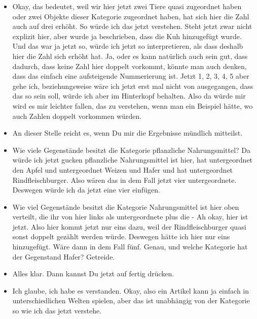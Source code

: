 {\begin{itemize}[]
    Also man kann Verknüpfungen auf unterschiedliche Arten herstellen.
    Eine Kategorie, welche sich unter Säugetiere einordnen lässt.
    Ich denke Fleischfressern. Ah okay, und das wird auch scheinbar so weitergereicht.
    Also oben ist jetzt hat sich jetzt die 2 in eine 3 verwandelt, obwohl es keine direkte Relation war, sondern eine indirekte Relation.
    \item {} Okay, das bedeutet, weil wir hier jetzt zwei Tiere quasi zugeordnet haben oder zwei Objekte dieser Kategorie zugeordnet haben, hat sich hier die Zahl auch auf drei erhöht.
    So würde ich das jetzt verstehen.
    Steht jetzt zwar nicht explizit hier, aber wurde ja beschrieben, dass die Kuh hinzugefügt wurde.
    Und das war ja jetzt so, würde ich jetzt so interpretieren, als dass deshalb hier die Zahl sich erhöht hat.
    Ja, oder es kann natürlich auch sein gut, dass dadurch, dass keine Zahl hier doppelt vorkommt, könnte man auch denken, dass das einfach eine aufsteigende Nummerierung ist.
    Jetzt 1, 2, 3, 4, 5 aber gehe ich, beziehungsweise wäre ich jetzt erst mal nicht von ausgegangen, dass das so sein soll, würde ich aber im Hinterkopf behalten.
    Also da würde mir wird es mir leichter fallen, das zu verstehen, wenn man ein Beispiel hätte, wo auch Zahlen doppelt vorkommen würden.
    \item {} An dieser Stelle reicht es, wenn Du mir die Ergebnisse mündlich mitteilst. 
    \item {} Wie viele Gegenstände besitzt die Kategorie pflanzliche Nahrungsmittel? Da würde ich jetzt gucken pflanzliche Nahrungsmittel ist hier, hat untergeordnet den Apfel und untergeordnet Weizen und Hafer und hat untergeordnet Rindfleischburger.
    Also wären das in dem Fall jetzt vier untergeordnete.
    Deswegen würde ich da jetzt eine vier einfügen.
    \item {} Wie viel Gegenstände besitzt die Kategorie Nahrungsmittel ist hier oben verteilt, die ihr von hier links als untergeordnete plus die - Ah okay, hier ist jetzt.
    Also hier kommt jetzt nur eins dazu, weil der Rindfleischburger quasi sonst doppelt gezählt werden würde.
    Deswegen hätte ich hier nur eins hinzugefügt.
    Wäre dann in dem Fall fünf. 
    Genau, und welche Kategorie hat der Gegenstand Hafer? 
    Getreide.
    \item {} Alles klar.
    Dann kannst Du jetzt auf fertig drücken.
    \item {} Ich glaube, ich habe es verstanden.
    Okay, also ein Artikel kann ja einfach in unterschiedlichen Welten spielen, aber das ist unabhängig von der Kategorie so wie ich das jetzt verstehe.

\end{itemize}}
